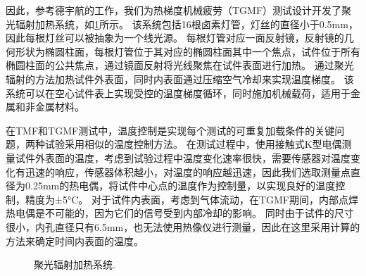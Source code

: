 因此，参考德宇航的工作\cite{BAUFELD2008219}，我们为热梯度机械疲劳（TGMF）测试设计开发了聚光辐射加热系统，如\ref{Fig:Radiation_Furnace2}所示。
该系统包括16根卤素灯管，灯丝的直径小于0.5mm，因此每根灯丝可以被抽象为一个线光源。
每根灯管对应一面反射镜，反射镜的几何形状为椭圆柱面，每根灯管位于其对应的椭圆柱面其中一个焦点，试件位于所有椭圆柱面的公共焦点，通过镜面反射将光线聚焦在试件表面进行加热。
通过聚光辐射的方法加热试件外表面，同时内表面通过压缩空气冷却来实现温度梯度。
该系统可以在空心试件表上实现受控的温度梯度循环，同时施加机械载荷，适用于金属和非金属材料。

在TMF和TGMF测试中，温度控制是实现每个测试的可重复加载条件的关键问题，两种试验采用相似的温度控制方法。
在测试过程中，使用接触式K型电偶测量试件外表面的温度，考虑到试验过程中温度变化速率很快，需要传感器对温度变化有迅速的响应，传感器体积越小，对温度的响应越迅速，因此我们选取测量点直径为0.25mm的热电偶，将试件中心点的温度作为控制量，以实现良好的温度控制，精度为±5°C。
对于试件内表面，考虑到气体流动，在TGMF期间，内部点焊热电偶是不可能的，因为它们的信号受到内部冷却的影响。
同时由于试件的尺寸很小，内孔直径只有6.5mm，也无法使用热像仪进行测量，因此在这里采用计算的方法来确定时间内表面的温度。
\begin{figure}[!htp]
\caption{聚光辐射加热系统.}
\label{Fig:Radiation_Furnace2}
\end{figure}


